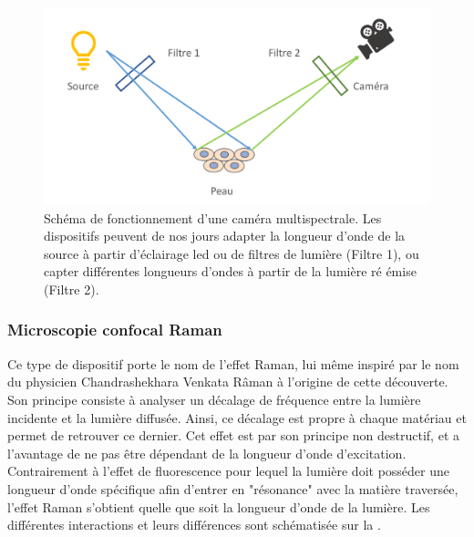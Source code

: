 \begin{figure}[H]
    \centering
    \includegraphics[width=\linewidth]{contents/chapter_2/resources/scheme_multispectral_principle.pdf}
    \caption{Schéma de fonctionnement d'une caméra multispectrale. Les dispositifs peuvent de nos jours adapter la longueur d'onde de la source à partir d'éclairage \gls{led} ou de filtres de lumière (Filtre 1), ou capter différentes longueurs d'ondes à partir de la lumière ré émise (Filtre 2).}
    \label{fig:scheme_multispectral_principle}
\end{figure}\par

\subsubsection{Microscopie confocal Raman}
Ce type de dispositif porte le nom de l'effet Raman, lui même inspiré par le nom du physicien Chandrashekhara Venkata Râman à  l'origine de cette découverte. Son principe consiste à analyser un décalage de fréquence entre la lumière incidente et la lumière diffusée. Ainsi, ce décalage est propre à chaque matériau et permet de retrouver ce dernier. Cet effet est par son principe non destructif, et a l'avantage de ne pas être dépendant de la longueur d'onde d'excitation. Contrairement à l'effet de fluorescence pour lequel la lumière doit posséder une longueur d'onde spécifique afin d'entrer en "résonance" avec la matière traversée, l'effet Raman s'obtient quelle que soit la longueur d'onde de la lumière. Les différentes interactions et leurs différences sont schématisée sur la .\par

